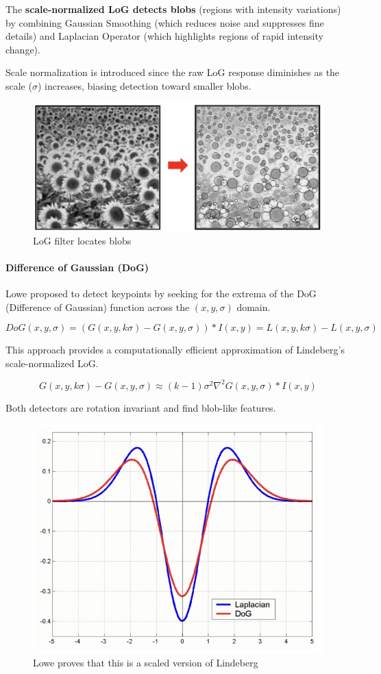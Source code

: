 The \textbf{scale-normalized LoG detects blobs} (regions with intensity variations) by combining Gaussian Smoothing (which reduces noise and suppresses fine details) and Laplacian Operator (which highlights regions of rapid intensity change).

Scale normalization is introduced since the raw LoG response diminishes as the scale ($\sigma$) increases, biasing detection toward smaller blobs.

\begin{figure}[htbp]
  \centering
  \includegraphics[width=0.7\linewidth]{./img/sunflower_blobs.jpg}
  \caption{LoG filter locates blobs}
  \label{fig:sunflower_blobs}
\end{figure}

\paragraph{Difference of Gaussian (DoG)}

Lowe proposed to detect keypoints by seeking for the extrema of the DoG (Difference of Gaussian) function across the $(x,y,\sigma)$ domain.

$$DoG(x,y,\sigma) = (G(x,y,k\sigma) - G(x,y,\sigma)) * I(x,y) = L(x,y,k\sigma) - L(x,y,\sigma)$$

This approach provides a computationally efficient approximation of Lindeberg's scale-normalized LoG.

$$G(x,y,k\sigma) - G(x,y,\sigma) \approx (k-1)\sigma^2\nabla^2 G(x,y,\sigma) * I(x,y)$$

Both detectors are rotation invariant and find blob-like features.

\begin{figure}[htbp]
  \centering
  \includegraphics[width=0.5\linewidth]{./img/dog.jpg}
  \caption{Lowe proves that this is a scaled version of Lindeberg}
  \label{fig:dog}
\end{figure}

